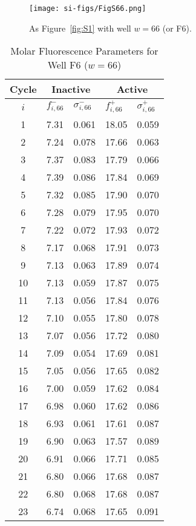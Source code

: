                 \begin{figure}
                    \centering
                    \texttt{[image: si-figs/FigS66.png]}
                    \caption{
                        As Figure~\ref{fig:S1} with well $w=66$ (or F6).
                    }
                \end{figure}
                \clearpage
    \begin{table}
        \caption{Molar Fluorescence Parameters for Well F6 ($w=66$)}
        \centering
        \begin{tabular}{c|ll|ll}
            Cycle & \multicolumn{2}{c|}{Inactive} & \multicolumn{2}{c}{Active} \\
            \hline
            $i$ & $f_{i,66}^{-}$ & $\sigma_{i,66}^{-}$ &  $f_{i,66}^{+}$ & $\sigma_{i,66}^{+}$ \\
            \hline
    1 & 7.31 & 0.061 & 18.05 & 0.059 \\
2 & 7.24 & 0.078 & 17.66 & 0.063 \\
3 & 7.37 & 0.083 & 17.79 & 0.066 \\
4 & 7.39 & 0.086 & 17.84 & 0.069 \\
5 & 7.32 & 0.085 & 17.90 & 0.070 \\
6 & 7.28 & 0.079 & 17.95 & 0.070 \\
7 & 7.22 & 0.072 & 17.93 & 0.072 \\
8 & 7.17 & 0.068 & 17.91 & 0.073 \\
9 & 7.13 & 0.063 & 17.89 & 0.074 \\
10 & 7.13 & 0.059 & 17.87 & 0.075 \\
11 & 7.13 & 0.056 & 17.84 & 0.076 \\
12 & 7.10 & 0.055 & 17.80 & 0.078 \\
13 & 7.07 & 0.056 & 17.72 & 0.080 \\
14 & 7.09 & 0.054 & 17.69 & 0.081 \\
15 & 7.05 & 0.056 & 17.65 & 0.082 \\
16 & 7.00 & 0.059 & 17.62 & 0.084 \\
17 & 6.98 & 0.060 & 17.62 & 0.086 \\
18 & 6.93 & 0.061 & 17.61 & 0.087 \\
19 & 6.90 & 0.063 & 17.57 & 0.089 \\
20 & 6.91 & 0.066 & 17.71 & 0.085 \\
21 & 6.80 & 0.066 & 17.68 & 0.087 \\
22 & 6.80 & 0.068 & 17.68 & 0.087 \\
23 & 6.74 & 0.068 & 17.65 & 0.091 \\

\end{tabular}
\end{table}
